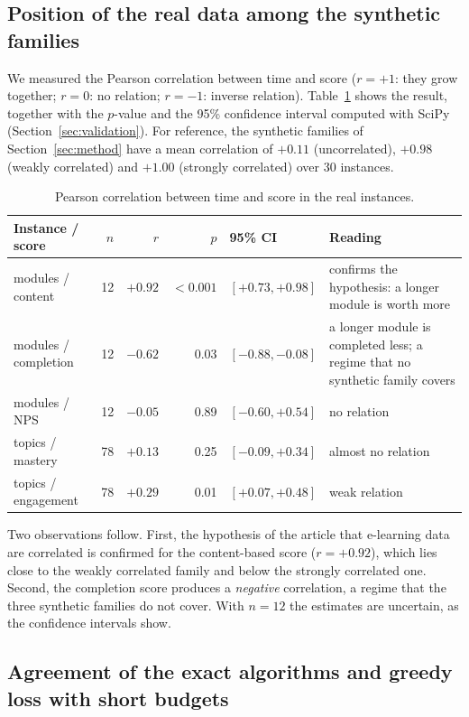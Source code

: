 \subsection{Position of the real data among the synthetic families}

We measured the Pearson correlation between time and score ($r=+1$: they grow together; $r=0$: no relation; $r=-1$: inverse relation). Table~\ref{tab:pearson} shows the result, together with the $p$-value and the 95\% confidence interval computed with SciPy (Section~\ref{sec:validation}). For reference, the synthetic families of Section~\ref{sec:method} have a mean correlation of $+0.11$ (uncorrelated), $+0.98$ (weakly correlated) and $+1.00$ (strongly correlated) over 30 instances.

\begin{table}[h]
\centering
\caption{Pearson correlation between time and score in the real instances.}\label{tab:pearson}
\small
\begin{tabularx}{\linewidth}{@{}l r r r l X@{}}
\toprule
Instance / score & $n$ & $r$ & $p$ & 95\% CI & Reading\\
\midrule
modules / content & 12 & $+0.92$ & $<0.001$ & $[+0.73,+0.98]$ & confirms the hypothesis: a longer module is worth more\\
modules / completion & 12 & $-0.62$ & 0.03 & $[-0.88,-0.08]$ & a longer module is completed less; a regime that no synthetic family covers\\
modules / NPS & 12 & $-0.05$ & 0.89 & $[-0.60,+0.54]$ & no relation\\
topics / mastery & 78 & $+0.13$ & 0.25 & $[-0.09,+0.34]$ & almost no relation\\
topics / engagement & 78 & $+0.29$ & 0.01 & $[+0.07,+0.48]$ & weak relation\\
\bottomrule
\end{tabularx}
\end{table}

Two observations follow. First, the hypothesis of the article that e-learning data are correlated is confirmed for the content-based score ($r=+0.92$), which lies close to the weakly correlated family and below the strongly correlated one. Second, the completion score produces a \emph{negative} correlation, a regime that the three synthetic families do not cover. With $n=12$ the estimates are uncertain, as the confidence intervals show.

\subsection{Agreement of the exact algorithms and greedy loss with short budgets}

